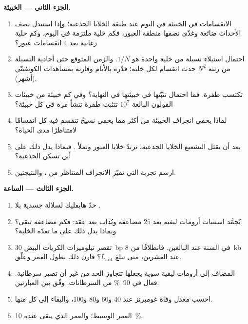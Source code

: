 \begin{problem}
\medskip
\noindent\textbf{الجزء الثاني --- الخبيئة.}
\begin{enumerate}[resume]
  \item الانقسامات في الخبيئة في اليوم عند طبقة الخلايا
        الجذعية؛ وإذا استبدل نصف الأحداث  ضائعة
        وغذّى نصفها منطقة العبور، فكم خلية ملتزمة في اليوم،
        وكم خلية زغابية بعد $4$ انقسامات عبور؟
  \item احتمال استيلاء نسيلة من خلية واحدة هو $1/N$. والزمن
        المتوقع حتى أحادية النسيلة من رتبة $N^{2}$ حدث انقسام
        لكل خلية؛ قدّره بالأيام وقارنه بمشاهدات الكونفيتّي
        (أشهر).
  \item تكتسب  طفرة. فما احتمال تثبّتها في خبيئتها
        في النهاية؟ وفي كم خبيئة من خبيئات القولون البالغة
        $10^{7}$ تتثبت طفرة تنشأ مرة في كل خبيئة؟
  \item لماذا يحمي انجراف الخبيئة من  أكثر مما يحمي
        نسيجٌ تنقسم فيه كل  انقسامًا لامتناظرًا مدى
        الحياة؟
  \item بعد أن يقتل التشعيع الخلايا الجذعية، ترتدّ خلايا
        العبور وتملأ . فبماذا يدل ذلك على أين تسكن
        الجذعية؟
  \item ارسم تجربة  التي تميّز الانجراف المتناظر
        من ، والنتيجتين.
\end{enumerate}

\medskip
\noindent\textbf{الجزء الثالث --- الساعة.}
\begin{enumerate}[resume]
  \item حدّ هايفليك لسلالة جسدية بلا .
  \item يُجمَّد استنبات أرومات ليفية بعد $25$ مضاعفة ويُذاب
        بعد عقد: فكم مضاعفة تبقى؟ وبماذا يدل ذلك على ما
        تعدّه الخلية؟
  \item تقصر تيلوميرات الكريات البيض \qty{30}{bp} في السنة عند
        البالغين. فانطلاقًا من \qty{8}{kb} عند العشرين، متى
        تبلغ $L_{\text{crit}}$؟ قارن ذلك بطول العمر وعلّق.
  \item {} المضاف إلى أرومات ليفية سوية يجعلها تتجاوز
        الحد من غير أن تصير سرطانية.  فعال في
        \qty{90}{\%} من السرطانات. وفّق بين العبارتين.
  \item احسب معدل وفاة غومبرتز عند 40 و60 و80 و100، والبقاء
        إلى كل منها.
  \item العمر الوسيط؛ والعمر الذي يبقى عنده \qty{10}{\%}.
\end{enumerate}


\end{problem}
